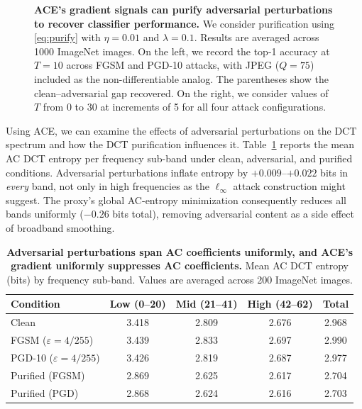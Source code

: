 \begin{figure}[ht]
\begin{minipage}[t]{0.51\linewidth}
  \end{minipage}
  \caption{
  \textbf{ACE's gradient signals can purify adversarial perturbations to recover classifier performance.}
  We consider purification using \eqref{eq:purify} with $\eta=0.01$ and $\lambda=0.1$.
  Results are averaged across 1000 ImageNet images.
  On the left, we record the top-1 accuracy at $T{=}10$ across FGSM and PGD-10 attacks, with JPEG ($Q{=}75$) included as the non-differentiable analog.
  The parentheses show the clean--adversarial gap recovered.
  On the right, we consider values of $T$ from 0 to 30 at increments of 5 for all four attack configurations.
  }
  \label{fig:purification}
\end{figure}

Using ACE, we can examine the effects of adversarial perturbations on the DCT spectrum and how the DCT purification influences it.
Table~\ref{tab:freq} reports the mean AC DCT entropy per frequency sub-band under clean, adversarial, and purified conditions.
Adversarial perturbations inflate entropy by $+0.009$--$+0.022$ bits in \emph{every} band, not only in high frequencies as the $\ell_\infty$ attack construction might suggest.
The proxy's global AC-entropy minimization consequently reduces all bands uniformly ($-0.26$ bits total), removing adversarial content as a side effect of broadband smoothing.

\begin{table}[ht]
  \centering
  \small
  \caption{
  \textbf{Adversarial perturbations span AC coefficients uniformly, and ACE's gradient uniformly suppresses AC coefficients.}
  Mean AC DCT entropy (bits) by frequency sub-band.
  Values are averaged across 200 ImageNet images.
  }
  \label{tab:freq}
  \begin{tabular}{lcccc}
    \toprule
    Condition & Low (0--20) & Mid (21--41) & High (42--62) & Total \\
    \midrule
    Clean              & 3.418 & 2.809 & 2.676 & 2.968 \\
    FGSM ($\varepsilon=4/255$)   & 3.439 & 2.833 & 2.697 & 2.990 \\
    PGD-10 ($\varepsilon=4/255$) & 3.426 & 2.819 & 2.687 & 2.977 \\
    Purified (FGSM)    & 2.869 & 2.625 & 2.617 & 2.704 \\
    Purified (PGD)     & 2.868 & 2.624 & 2.616 & 2.703 \\
    \bottomrule
  \end{tabular}
\end{table}

